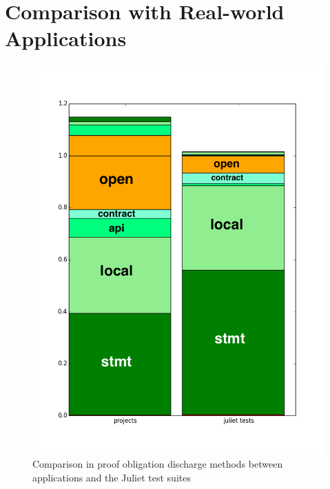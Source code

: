 \documentclass[11pt]{article}
\begin{document}
\section{Comparison with Real-world Applications}
\label{sec:apps}

\begin{figure}[h]
\begin{center}
\includegraphics[width=.6\textwidth]{projects_vs_juliet.png}
\end{center}
\caption{\label{fig:appvsjuliet}Comparison in proof obligation discharge methods between
applications and the Juliet test suites}
\end{figure}
\end{document}
